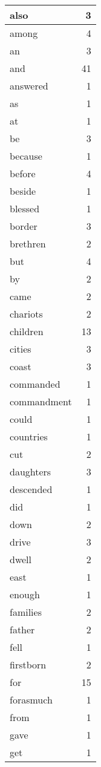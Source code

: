 \begin{center}
\begin{longtable}{l|r}
also & 3 \\ \hline
among & 4 \\ \hline
an & 3 \\ \hline
and & 41 \\ \hline
answered & 1 \\ \hline
as & 1 \\ \hline
at & 1 \\ \hline
be & 3 \\ \hline
because & 1 \\ \hline
before & 4 \\ \hline
beside & 1 \\ \hline
blessed & 1 \\ \hline
border & 3 \\ \hline
brethren & 2 \\ \hline
but & 4 \\ \hline
by & 2 \\ \hline
came & 2 \\ \hline
chariots & 2 \\ \hline
children & 13 \\ \hline
cities & 3 \\ \hline
coast & 3 \\ \hline
commanded & 1 \\ \hline
commandment & 1 \\ \hline
could & 1 \\ \hline
countries & 1 \\ \hline
cut & 2 \\ \hline
daughters & 3 \\ \hline
descended & 1 \\ \hline
did & 1 \\ \hline
down & 2 \\ \hline
drive & 3 \\ \hline
dwell & 2 \\ \hline
east & 1 \\ \hline
enough & 1 \\ \hline
families & 2 \\ \hline
father & 2 \\ \hline
fell & 1 \\ \hline
firstborn & 2 \\ \hline
for & 15 \\ \hline
forasmuch & 1 \\ \hline
from & 1 \\ \hline
gave & 1 \\ \hline
get & 1 \\ \hline

\end{longtable}
\end{center}

